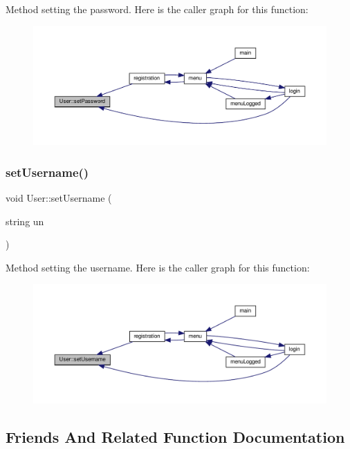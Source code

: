 Method setting the password. Here is the caller graph for this function\+:\nopagebreak
\begin{figure}[H]
\begin{center}
\leavevmode
\includegraphics[width=350pt]{class_user_ab8d3c965902b378fc3472b388a97d56d_icgraph}
\end{center}
\end{figure}
\mbox{\label{class_user_a453323a9766e086f1967a96d79fc8b76}} 
\subsubsection{\texorpdfstring{set\+Username()}{setUsername()}}
{\footnotesize\ttfamily void User\+::set\+Username (\begin{DoxyParamCaption}\item[{string}]{un }\end{DoxyParamCaption})}

Method setting the username. Here is the caller graph for this function\+:\nopagebreak
\begin{figure}[H]
\begin{center}
\leavevmode
\includegraphics[width=350pt]{class_user_a453323a9766e086f1967a96d79fc8b76_icgraph}
\end{center}
\end{figure}


\subsection{Friends And Related Function Documentation}
\mbox{\label{class_user_acf1038a8d320684dc3fbdd5e4308e062}} 
